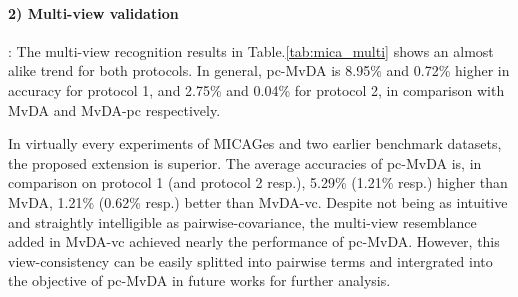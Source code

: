     \paragraph{2) Multi-view validation}: The multi-view recognition results in Table.\ref{tab:mica_multi} shows an almost alike trend for both protocols. In general, pc-MvDA is 8.95\% and 0.72\% higher in accuracy for protocol 1, and 2.75\% and 0.04\% for protocol 2, in comparison with MvDA and MvDA-pc respectively.

    In virtually every experiments of MICAGes and two earlier benchmark datasets, the proposed extension is superior. The average accuracies of pc-MvDA is, in comparison on protocol 1 (and protocol 2 resp.), 5.29\% (1.21\% resp.) higher than MvDA, 1.21\% (0.62\% resp.) better than MvDA-vc. Despite not being as intuitive and straightly intelligible as pairwise-covariance, the multi-view resemblance added in MvDA-vc achieved nearly the performance of pc-MvDA. However, this view-consistency can be easily splitted into pairwise terms and intergrated into the objective of pc-MvDA in future works for further analysis.

    \begin{table}[htbp]
    \centering
    \caption{Multi-view recognition comparison on MICAGes dataset.}
    \label{tab:mica_multi}
    \end{table}

